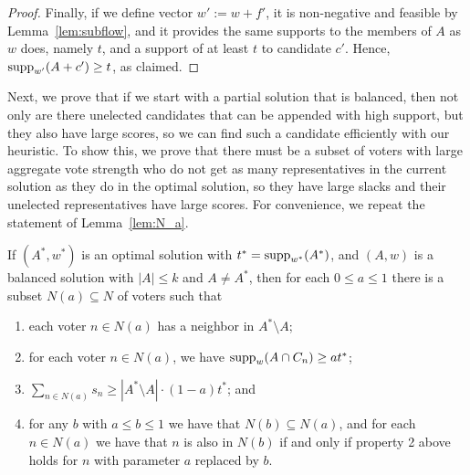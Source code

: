 \begin{proof}
Finally, if we define vector $w':=w+f'$, it is non-negative and feasible by Lemma~\ref{lem:subflow}, and it provides the same supports to the members of $A$ as $w$ does, namely $t$, and a support of at least $t$ to candidate $c'$. Hence, $\operatorname{supp}_{w'}(A+c')\geq t$, as claimed.   
\end{proof}

Next, we prove that if we start with a partial solution that is balanced, then not only are there unelected candidates that can be appended with high support, but they also have large scores, so we can find such a candidate efficiently with our heuristic. 
To show this, we prove that there must be a subset of voters with large aggregate vote strength who do not get as many representatives in the current solution as they do in the optimal solution, so they have large slacks and their unelected representatives have large scores. For convenience, we repeat the statement of Lemma~\ref{lem:N_a}.

\begin{lemma*}
If $(A^*, w^*)$ is an optimal solution with $t^*=\operatorname{supp}_{w^*}(A^*)$, and $(A,w)$ is a balanced solution with $|A|\leq k$ and $A\neq A^*$, then for each $0\leq a\leq 1$ there is a subset $N(a)\subseteq N$ of voters such that 
\begin{enumerate}
	\item each voter $n\in N(a)$ has a neighbor in $A^*\setminus A$;
	\item for each voter $n\in N(a)$, we have $\operatorname{supp}_w(A\cap C_n)\geq at^*$;
	\item $\sum_{n\in N(a)} s_n \geq |A^* \setminus A|\cdot (1-a) t^*$; and
	\item for any $b$ with $a\leq b\leq 1$ we have that $N(b)\subseteq N(a)$, and for each $n\in N(a)$ we have that $n$ is also in $N(b)$ if and only if property 2 above holds for $n$ with parameter $a$ replaced by $b$.
\end{enumerate}
\end{lemma*}

